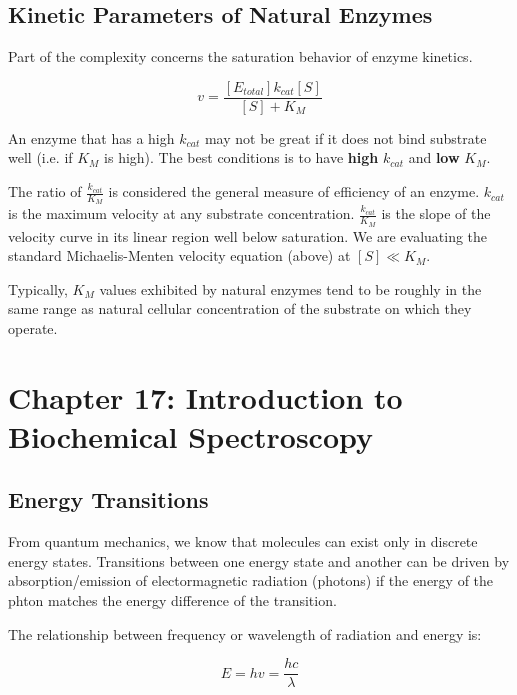 \documentclass[12pt, letterpaper]{article}
\begin{document}
\subsection*{Kinetic Parameters of Natural Enzymes}
Part of the complexity concerns the saturation behavior of enzyme kinetics. 

\begin{equation*}
    v = \frac{[E_{total}] k_{cat}[S]}{[S] + K_M}
\end{equation*}

An enzyme that has a high $k_{cat}$ may not be great if it does not bind substrate well (i.e. if $K_M$ is high). 
The best conditions is to have \textbf{high} $k_{cat}$ and \textbf{low} $K_M$. 

The ratio of $\frac{k_{cat}}{K_M}$ is considered the general measure of efficiency of an enzyme. $k_{cat}$ is the maximum velocity at any substrate concentration. 
$\frac{k_{cat}}{K_M}$ is the slope of the velocity curve in its linear region well below saturation. We are evaluating the standard Michaelis-Menten velocity equation (above) at $[S] \ll K_M$. 

Typically, $K_M$ values exhibited by natural enzymes tend to be roughly in the same range as natural cellular concentration of the substrate on which they operate. 

\newpage
\section*{Chapter 17: Introduction to Biochemical Spectroscopy}

\subsection*{Energy Transitions}

From quantum mechanics, we know that molecules can exist only in discrete energy states. Transitions between one energy state and another 
can be driven by absorption/emission of electormagnetic radiation (photons) if the energy of the phton matches the energy difference of the 
transition. 

The relationship between  frequency or wavelength of radiation and energy is: 

\begin{equation*}
    E = hv = \frac{hc}{\lambda}
\end{equation*}
\end{document}
